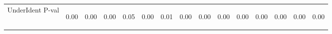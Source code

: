 \begin{center}
\begin{tabular}{lcccccccccccccc}
UnderIdent P-val & \begin{normalsize}0.00\end{normalsize} & \begin{normalsize}0.00\end{normalsize} & \begin{normalsize}0.00\end{normalsize} & \begin{normalsize}0.05\end{normalsize} & \begin{normalsize}0.00\end{normalsize} & \begin{normalsize}0.01\end{normalsize} & \begin{normalsize}0.00\end{normalsize} & \begin{normalsize}0.00\end{normalsize} & \begin{normalsize}0.00\end{normalsize} & \begin{normalsize}0.00\end{normalsize} & \begin{normalsize}0.00\end{normalsize} & \begin{normalsize}0.00\end{normalsize} & \begin{normalsize}0.00\end{normalsize} & \begin{normalsize}0.00\end{normalsize}\\

\end{tabular}
\end{center}
